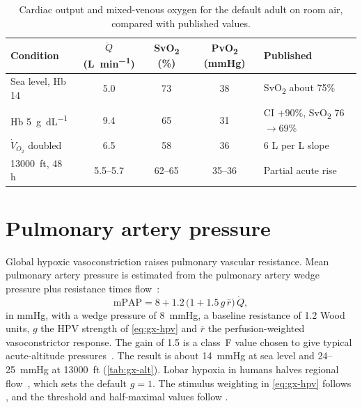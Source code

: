 \begin{table}[htbp]\centering\small
\caption{Cardiac output and mixed-venous oxygen for the default adult on room air, compared with published values.}
\label{tab:gx-q}
\begin{tabular}{@{}lcccl@{}}\toprule
Condition & $\dot Q$ (\si{\liter\per\minute}) & SvO\textsubscript{2} (\%) & PvO\textsubscript{2} (\si{\mmHg}) & Published\\\midrule
Sea level, Hb 14 & 5.0 & 73 & 38 & SvO\textsubscript{2} about 75\%\\
Hb \SI{5}{\gram\per\deci\liter} & 9.4 & 65 & 31 & CI $+90\%$, SvO\textsubscript{2} 76$\to$69\%~\citep{weiskopf1998}\\
$\dot V_{O_2}$ doubled & 6.5 & 58 & 36 & 6 L per L slope~\citep{joyner2021}\\
\SI{13000}{ft}, 48 h & 5.5--5.7 & 62--65 & 35--36 & Partial acute rise~\citep{phillips1988,siebenmann2015}\\\bottomrule
\end{tabular}
\end{table}

\section{Pulmonary artery pressure}
\label{sec:gx-pap}
Global hypoxic vasoconstriction raises pulmonary vascular resistance. Mean pulmonary artery pressure is estimated from the pulmonary artery wedge pressure plus resistance times flow~\citep{naeije2010}:
\begin{equation}
\mathrm{mPAP}=8+1.2\,\bigl(1+1.5\,g\,\bar r\bigr)\,\dot Q,
\label{eq:gx-pap}
\end{equation}
in \si{\mmHg}, with a wedge pressure of \SI{8}{\mmHg}, a baseline resistance of 1.2 Wood units, $g$ the HPV strength of \cref{eq:gx-hpv} and $\bar r$ the perfusion-weighted vasoconstrictor response. The gain of 1.5 is a class~F value chosen to give typical acute-altitude pressures~\citep{naeije2010}. The result is about \SI{14}{\mmHg} at sea level and 24--\SI{25}{\mmHg} at \SI{13000}{ft} (\cref{tab:gx-alt}). Lobar hypoxia in humans halves regional flow~\citep{sylvester2012}, which sets the default $g=1$. The stimulus weighting in \cref{eq:gx-hpv} follows \citet{marshall1983}, and the threshold and half-maximal values follow \citet{hopkins2023}.

